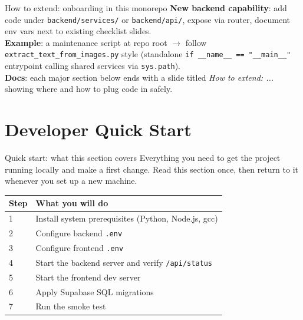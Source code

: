 \documentclass[aspectratio=169]{beamer}
\begin{document}
\begin{frame}{How to extend: onboarding in this monorepo}
  \small
  \textbf{New backend capability}: add code under \texttt{backend/services/} or \texttt{backend/api/}, expose via router, document env vars next to existing checklist slides.\\
  \textbf{Example}: a maintenance script at repo root $\rightarrow$ follow \texttt{extract\_text\_from\_images.py} style (standalone \texttt{if \_\_name\_\_ == "\_\_main\_\_"} entrypoint calling shared services via \texttt{sys.path}).\\
  \textbf{Docs}: each major section below ends with a slide titled \textit{How to extend: ...} showing where and how to plug code in safely.
\end{frame}

\section{Developer Quick Start}

\begin{frame}{Quick start: what this section covers}
  \small
  Everything you need to get the project running locally and make a first change.
  Read this section once, then return to it whenever you set up a new machine.\\[0.5em]
  \begin{tabular}{@{}lp{9.5cm}@{}}
    \toprule
    Step & What you will do \\
    \midrule
    1 & Install system prerequisites (Python, Node.js, gcc) \\
    2 & Configure backend \texttt{.env} \\
    3 & Configure frontend \texttt{.env} \\
    4 & Start the backend server and verify \texttt{/api/status} \\
    5 & Start the frontend dev server \\
    6 & Apply Supabase SQL migrations \\
    7 & Run the smoke test \\
    \bottomrule
  \end{tabular}
\end{frame}
\end{document}
